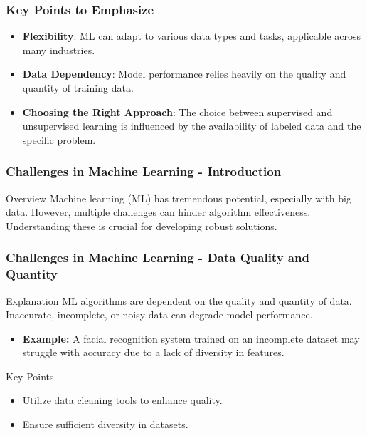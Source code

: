 \documentclass[aspectratio=169]{beamer}
\begin{document}
\begin{frame}[fragile]
    \frametitle{Key Points to Emphasize}
    \begin{itemize}
        \item \textbf{Flexibility}: ML can adapt to various data types and tasks, applicable across many industries.
        \item \textbf{Data Dependency}: Model performance relies heavily on the quality and quantity of training data.
        \item \textbf{Choosing the Right Approach}: The choice between supervised and unsupervised learning is influenced by the availability of labeled data and the specific problem.
    \end{itemize}
\end{frame}

\begin{frame}[fragile]
    \frametitle{Challenges in Machine Learning - Introduction}
    \begin{block}{Overview}
        Machine learning (ML) has tremendous potential, especially with big data. 
        However, multiple challenges can hinder algorithm effectiveness.
        Understanding these is crucial for developing robust solutions.
    \end{block}
\end{frame}

\begin{frame}[fragile]
    \frametitle{Challenges in Machine Learning - Data Quality and Quantity}
    \begin{block}{Explanation}
        ML algorithms are dependent on the quality and quantity of data. 
        Inaccurate, incomplete, or noisy data can degrade model performance.
    \end{block}
    \begin{itemize}
        \item \textbf{Example:} A facial recognition system trained on an incomplete dataset may struggle with accuracy due to a lack of diversity in features.
    \end{itemize}
    \begin{block}{Key Points}
        \begin{itemize}
            \item Utilize data cleaning tools to enhance quality.
            \item Ensure sufficient diversity in datasets.
        \end{itemize}
    \end{block}
\end{frame}
\end{document}
